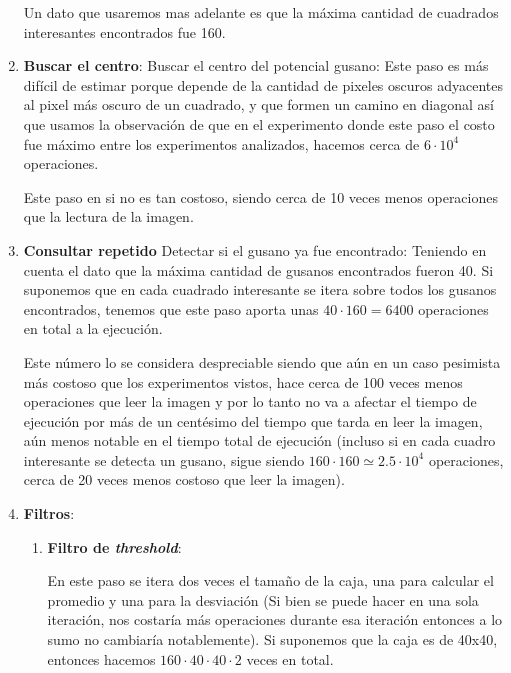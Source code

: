\documentclass{article}
\begin{document}
\begin{enumerate}[topsep=0pt]
\hspace{0.2cm} Un dato que usaremos mas adelante es que la máxima cantidad de cuadrados interesantes encontrados fue 160.

\item \textbf{Buscar el centro}: Buscar el centro del potencial gusano: Este paso es más difícil de estimar porque depende de la cantidad de pixeles oscuros adyacentes al pixel más oscuro de un cuadrado, y que formen un camino en diagonal así que usamos la observación de que en el experimento donde este paso el costo fue máximo entre los experimentos analizados, hacemos cerca de $6 \cdot 10^4$ operaciones.

\hspace{0.2cm} Este paso en si no es tan costoso, siendo cerca de 10 veces menos operaciones que la lectura de la imagen.

\item \textbf{Consultar repetido} Detectar si el gusano ya fue encontrado: Teniendo en cuenta el dato que la máxima cantidad de gusanos encontrados fueron 40. Si suponemos que en cada cuadrado interesante se itera sobre todos los gusanos encontrados, tenemos que este paso aporta unas $40\cdot160 = 6400$ operaciones en total a la ejecución.

\hspace{0.2cm} Este número lo se considera despreciable siendo que aún en un caso pesimista más costoso que los experimentos vistos, hace cerca de 100 veces menos operaciones que leer la imagen y por lo tanto no va a afectar el tiempo de ejecución por más de un centésimo del tiempo que tarda en leer la imagen, aún menos notable en el tiempo total de ejecución (incluso si en cada cuadro interesante se detecta un gusano, sigue siendo $160\cdot160 \simeq 2.5 \cdot 10^4$ operaciones, cerca de 20 veces menos costoso que leer la imagen).

\item \textbf{Filtros}:
\begin{enumerate}
 
\item \textbf{Filtro de \emph{threshold}}:

\hspace{0.2cm} En este paso se itera dos veces el tamaño de la caja, una para calcular el promedio y una para la desviación (Si bien se puede hacer en una sola iteración, nos costaría más operaciones durante esa iteración entonces a lo sumo no cambiaría notablemente). Si suponemos que la caja es de 40x40, entonces hacemos $160\cdot40\cdot40\cdot2$ veces en total.


\end{enumerate}
\end{enumerate}
\end{document}
